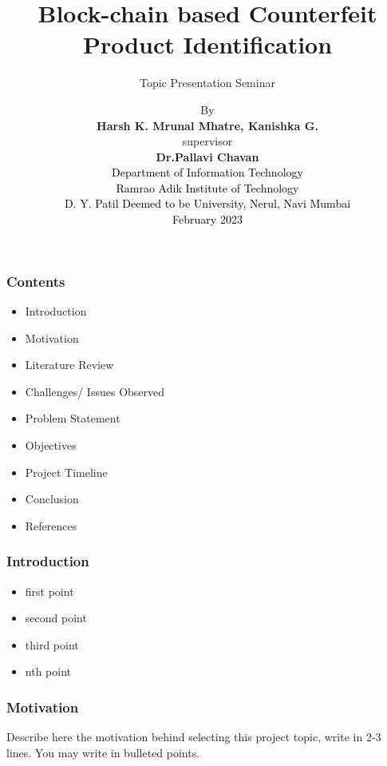 \documentclass{beamer}
\title{Block-chain based Counterfeit Product Identification }
\subtitle{Topic Presentation Seminar}
\begin{document}
\author[]  {By \\ \vspace{0.05in} \textbf{Harsh K. Mrunal Mhatre, Kanishka G.}\\  \vspace{0.01in} {
supervisor} \\ \textbf{Dr.Pallavi Chavan}\\
\textcolor{black}{Department of Information Technology} \\ \textcolor{black}{Ramrao Adik Institute of Technology \\
	D. Y. Patil Deemed to be University, Nerul, Navi Mumbai\\
February 2023} \\
}

%
\begin{frame}
\begin{center}
\end{center}
\titlepage
\end{frame}
%
\begin{frame}
\frametitle{Contents}
\begin{itemize}
\item{Introduction}
\item{Motivation}
\item {Literature Review}
\item {Challenges/ Issues Observed}
\item {Problem Statement}
\item {Objectives}
\item {Project Timeline}
\item {Conclusion}
\item {References}
\end{itemize}
\end{frame}




\begin{frame}
\frametitle{Introduction}
\begin{itemize}
\item {first point}
\item {second point}
\item {third point}
\item {nth point}

\end{itemize}
\end{frame}


\begin{frame}
\frametitle{Motivation}
Describe here the motivation behind selecting  this project topic, write in 2-3 lines. You may write in bulleted points.
\end{frame}
\end{document}
